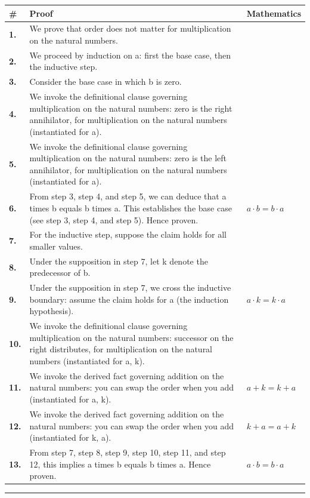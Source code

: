 \documentclass[11pt]{article}
\theoremstyle{definition}
\begin{document}
\begin{tabular}{@{} >{\raggedright\arraybackslash}p{} >{\raggedright\arraybackslash}p{} >{\raggedleft\arraybackslash}p{} @{}}
\textbf{\#} & \textbf{Proof} & \textbf{Mathematics} \\
\midrule
\textbf{1.} & We prove that order does not matter for multiplication on the natural numbers. & \\[0.45em]
\textbf{2.} & We proceed by induction on a: first the base case, then the inductive step. & \\[0.45em]
\textbf{3.} & Consider the base case in which b is zero. & \\[0.45em]
\textbf{4.} & We invoke the definitional clause governing multiplication on the natural numbers: zero is the right annihilator, for multiplication on the natural numbers (instantiated for a). & \\[0.45em]
\textbf{5.} & We invoke the definitional clause governing multiplication on the natural numbers: zero is the left annihilator, for multiplication on the natural numbers (instantiated for a). & \\[0.45em]
\textbf{6.} & From step 3, step 4, and step 5, we can deduce that a times b equals b times a. This establishes the base case (see step 3, step 4, and step 5). Hence proven. & $\displaystyle a \cdot b = b \cdot a$ \\[0.45em]
\textbf{7.} & For the inductive step, suppose the claim holds for all smaller values. & \\[0.45em]
\textbf{8.} & Under the supposition in step 7, let k denote the predecessor of b. & \\[0.45em]
\textbf{9.} & Under the supposition in step 7, we cross the inductive boundary: assume the claim holds for a (the induction hypothesis). & $\displaystyle a \cdot k = k \cdot a$ \\[0.45em]
\textbf{10.} & We invoke the definitional clause governing multiplication on the natural numbers: successor on the right distributes, for multiplication on the natural numbers (instantiated for a, k). & \\[0.45em]
\textbf{11.} & We invoke the derived fact governing addition on the natural numbers: you can swap the order when you add (instantiated for a, k). & $\displaystyle a + k = k + a$ \\[0.45em]
\textbf{12.} & We invoke the derived fact governing addition on the natural numbers: you can swap the order when you add (instantiated for k, a). & $\displaystyle k + a = a + k$ \\[0.45em]
\textbf{13.} & From step 7, step 8, step 9, step 10, step 11, and step 12, this implies a times b equals b times a. Hence proven. & $\displaystyle a \cdot b = b \cdot a$ \\[0.45em]
\bottomrule
\end{tabular}
\label{thm:Nat-multiplication-order_does_not_matter}
\par\medskip\hrule
\end{document}
